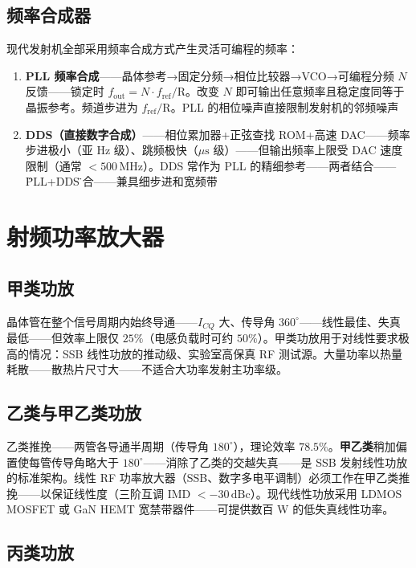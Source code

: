 \documentclass[12pt,UTF8]{ctexbook}
\begin{document}
\subsection{频率合成器}

现代发射机全部采用频率合成方式产生灵活可编程的频率：
\begin{enumerate}
\item \textbf{PLL 频率合成}——晶体参考→固定分频→相位比较器→VCO→可编程分频 $N$ 反馈——锁定时 $f_{\mathrm{out}}=N\cdot f_{\mathrm{ref}}/\mathrm{R}$。改变 $N$ 即可输出任意频率且稳定度同等于晶振参考。频道步进为 $f_{\mathrm{ref}}/\mathrm{R}$。PLL 的相位噪声直接限制发射机的邻频噪声
\item \textbf{DDS（直接数字合成）}——相位累加器+正弦查找 ROM+高速 DAC——频率步进极小（亚 Hz 级）、跳频极快（$\mu\mathrm{s}$ 级）——但输出频率上限受 DAC 速度限制（通常 $<500\,\mathrm{MHz}$）。DDS 常作为 PLL 的精细参考——两者结合——\"PLL+DDS\"综合——兼具细步进和宽频带
\end{enumerate}

\section{射频功率放大器}
\label{sec:rf_power_amplifier}

\subsection{甲类功放}

晶体管在整个信号周期内始终导通——$I_{CQ}$ 大、传导角 $360^\circ$——线性最佳、失真最低——但效率上限仅 $25\%$（电感负载时可约 $50\%$）。甲类功放用于对线性要求极高的情况：SSB 线性功放的推动级、实验室高保真 RF 测试源。大量功率以热量耗散——散热片尺寸大——不适合大功率发射主功率级。

\subsection{乙类与甲乙类功放}

乙类推挽——两管各导通半周期（传导角 $180^\circ$），理论效率 $78.5\%$。\textbf{甲乙类}稍加偏置使每管传导角略大于 $180^\circ$——消除了乙类的交越失真——是 SSB 发射线性功放的标准架构。线性 RF 功率放大器（SSB、数字多电平调制）必须工作在甲乙类推挽——以保证线性度（三阶互调 IMD $<-30\,\mathrm{dBc}$）。现代线性功放采用 LDMOS MOSFET 或 GaN HEMT 宽禁带器件——可提供数百 W 的低失真线性功率。

\subsection{丙类功放}
\end{document}
